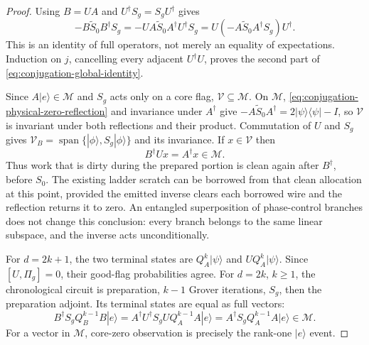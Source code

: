 \documentclass[11pt]{article}
\begin{document}
\begin{proof}
Using $B=UA$ and $U^\dagger S_g=S_gU^\dagger$ gives
\begin{equation}
 -B\widetilde S_0B^\dagger S_g
 =-U A\widetilde S_0A^\dagger U^\dagger S_g
 =U(-A\widetilde S_0A^\dagger S_g)U^\dagger.
 \label{eq:conjugation-identity-derivation}
\end{equation}
This is an identity of full operators, not merely an equality of
expectations. Induction on $j$, cancelling every adjacent
$U^\dagger U$, proves the second part of
\eqref{eq:conjugation-global-identity}.

Since $A|e\rangle\in\mathcal M$ and $S_g$ acts only on a core flag,
$\mathcal V\subseteq\mathcal M$. On $\mathcal M$,
\eqref{eq:conjugation-physical-zero-reflection} and invariance under
$A^\dagger$ give
$-A\widetilde S_0A^\dagger=2|\psi\rangle\langle\psi|-I$, so
$\mathcal V$ is invariant under both reflections and their product.
Commutation of $U$ and $S_g$ gives
$\mathcal V_B=\operatorname{span}\{|\phi\rangle,S_g|\phi\rangle\}$
and its invariance. If $x\in\mathcal V$ then
\begin{equation}
 B^\dagger Ux=A^\dagger x\in\mathcal M.
 \label{eq:conjugation-restored-cleanliness}
\end{equation}
Thus work that is dirty during the prepared portion is clean again
after $B^\dagger$, before $S_0$. The existing ladder scratch can be
borrowed from that clean allocation at this point, provided the
emitted inverse clears each borrowed wire and the reflection returns
it to zero. An entangled superposition of phase-control branches does
not change this conclusion: every branch belongs to the same linear
subspace, and the inverse acts unconditionally.

For $d=2k+1$, the two terminal states are
$Q_A^k|\psi\rangle$ and $UQ_A^k|\psi\rangle$. Since
$[U,\Pi_g]=0$, their good-flag probabilities agree. For $d=2k$,
$k\geq1$, the chronological circuit is preparation, $k-1$ Grover
iterations, $S_g$, then the preparation adjoint. Its terminal states
are equal as full vectors:
\begin{equation}
 B^\dagger S_g Q_B^{k-1}B|e\rangle
 =A^\dagger U^\dagger S_gUQ_A^{k-1}A|e\rangle
 =A^\dagger S_gQ_A^{k-1}A|e\rangle\in\mathcal M.
 \label{eq:conjugation-even-state}
\end{equation}
For a vector in $\mathcal M$, core-zero observation is precisely the
rank-one $|e\rangle$ event.


\end{proof}
\end{document}
